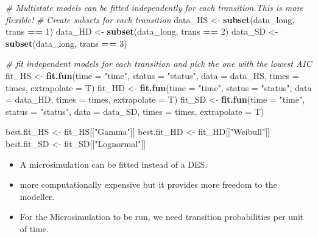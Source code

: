 \documentclass[
]{article}
\newenvironment{Shaded}{\begin{snugshade}}{\end{snugshade}}
\newcommand{\CommentTok}[1]{\textcolor[rgb]{0.56,0.35,0.01}{\textit{#1}}}
\newcommand{\DataTypeTok}[1]{\textcolor[rgb]{0.13,0.29,0.53}{#1}}
\newcommand{\DecValTok}[1]{\textcolor[rgb]{0.00,0.00,0.81}{#1}}
\newcommand{\KeywordTok}[1]{\textcolor[rgb]{0.13,0.29,0.53}{\textbf{#1}}}
\newcommand{\NormalTok}[1]{#1}
\newcommand{\OperatorTok}[1]{\textcolor[rgb]{0.81,0.36,0.00}{\textbf{#1}}}
\newcommand{\StringTok}[1]{\textcolor[rgb]{0.31,0.60,0.02}{#1}}
\providecommand{\tightlist}{%
  \setlength{\itemsep}{0pt}\setlength{\parskip}{0pt}}
\begin{document}
\begin{Shaded}
\begin{Highlighting}[]
\CommentTok{# Multistate models can be fitted independently for each transition.This is more flexible!}
\CommentTok{# Create subsets for each transition}
\NormalTok{data_HS <-}\StringTok{ }\KeywordTok{subset}\NormalTok{(data_long, trans }\OperatorTok{==}\StringTok{ }\DecValTok{1}\NormalTok{)}
\NormalTok{data_HD <-}\StringTok{ }\KeywordTok{subset}\NormalTok{(data_long, trans }\OperatorTok{==}\StringTok{ }\DecValTok{2}\NormalTok{)}
\NormalTok{data_SD <-}\StringTok{ }\KeywordTok{subset}\NormalTok{(data_long, trans }\OperatorTok{==}\StringTok{ }\DecValTok{3}\NormalTok{)}

\CommentTok{# fit independent models for each transition and pick the one with the lowest AIC}
\NormalTok{fit_HS <-}\StringTok{ }\KeywordTok{fit.fun}\NormalTok{(}\DataTypeTok{time =} \StringTok{"time"}\NormalTok{, }\DataTypeTok{status =} \StringTok{"status"}\NormalTok{, }\DataTypeTok{data =}\NormalTok{ data_HS, }\DataTypeTok{times =}\NormalTok{ times, }
                  \DataTypeTok{extrapolate =}\NormalTok{ T)}
\NormalTok{fit_HD <-}\StringTok{ }\KeywordTok{fit.fun}\NormalTok{(}\DataTypeTok{time =} \StringTok{"time"}\NormalTok{, }\DataTypeTok{status =} \StringTok{"status"}\NormalTok{, }\DataTypeTok{data =}\NormalTok{ data_HD, }\DataTypeTok{times =}\NormalTok{ times, }
                  \DataTypeTok{extrapolate =}\NormalTok{ T)}
\NormalTok{fit_SD <-}\StringTok{ }\KeywordTok{fit.fun}\NormalTok{(}\DataTypeTok{time =} \StringTok{"time"}\NormalTok{, }\DataTypeTok{status =} \StringTok{"status"}\NormalTok{, }\DataTypeTok{data =}\NormalTok{ data_SD, }\DataTypeTok{times =}\NormalTok{ times, }
                  \DataTypeTok{extrapolate =}\NormalTok{ T)}

\NormalTok{best.fit_HS <-}\StringTok{ }\NormalTok{fit_HS[[}\StringTok{"Gamma"}\NormalTok{]]}
\NormalTok{best.fit_HD <-}\StringTok{ }\NormalTok{fit_HD[[}\StringTok{"Weibull"}\NormalTok{]]}
\NormalTok{best.fit_SD <-}\StringTok{ }\NormalTok{fit_SD[[}\StringTok{"Lognormal"}\NormalTok{]]}
\end{Highlighting}
\end{Shaded}

\begin{itemize}
\tightlist
\item
  A microsimulation can be fitted instead of a DES.
\item
  more computationally expensive but it provides more freedom to the
  modeller.
\item
  For the Microsimulation to be run, we need transition probabilities
  per unit of time.
\end{itemize}
\end{document}
